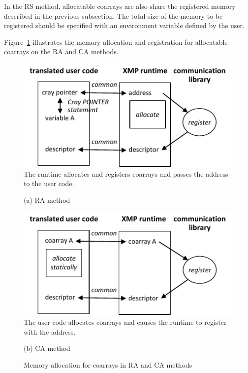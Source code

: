 In the RS method, allocatable coarrays are also share the registered memory
described in the previous subsection. The total size of the memory to be registered
should be specified with an environment variable defined by the user.

Figure~\ref{fig:register-RA-CA} illustrates the memory allocation and registration
for allocatable coarrays on the RA and CA methods. 

\begin{figure}[tbh]
 \begin{center}
  \includegraphics[scale=0.9, trim=0mm 0mm 0mm 0mm, clip]{figs/register-RA-tmp.pdf}\\
The runtime allocates and registers coarrays and passes the address to the user code.
 \end{center}
 \begin{center}
(a) RA method
 \end{center}
 \begin{center}
  \includegraphics[scale=0.9, trim=0mm 0mm 0mm 0mm, clip]{figs/register-CA-tmp.pdf}\\
The user code allocates coarrays and causes the runtime to register with the address.
 \end{center}
 \begin{center}
(b) CA method
 \end{center}
 \caption{Memory allocation for coarrays in RA and CA methods}
 \label{fig:register-RA-CA}
\end{figure}


